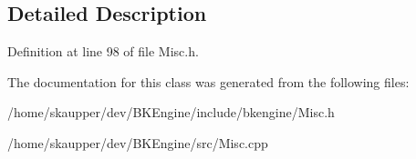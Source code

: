 \subsection{Detailed Description}


Definition at line 98 of file Misc.\+h.



The documentation for this class was generated from the following files\+:\begin{DoxyCompactItemize}
\item 
/home/skaupper/dev/\+B\+K\+Engine/include/bkengine/Misc.\+h\item 
/home/skaupper/dev/\+B\+K\+Engine/src/Misc.\+cpp\end{DoxyCompactItemize}
